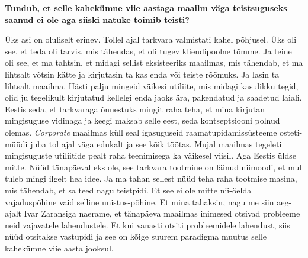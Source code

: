 \textbf{Tundub, et selle kahekümne viie aastaga maailm väga teistsuguseks 
saanud ei ole aga siiski natuke toimib teisti?}

Üks asi on oluliselt erinev. Tollel ajal tarkvara valmistati kahel põhjusel. 
Üks oli see, et teda oli tarvis, mis tähendas, et  oli tugev kliendipoolne 
tõmme. Ja teine oli see, et ma tahtsin, et midagi sellist eksisteeriks 
maailmas, mis tähendab, et ma lihtsalt võtsin kätte ja kirjutasin ta kas enda 
või teiste rõõmuks. Ja lasin ta lihtsalt maailma. Hästi palju mingeid väikesi 
utiliite, mis midagi kasulikku tegid, olid ju tegelikult kirjutatud kellelgi 
enda jaoks ära, pakendatud ja saadetud laiali. Eestis seda, et tarkvaraga 
õnnestuks mingit raha teha, et mina kirjutan mingisuguse vidinaga ja keegi 
maksab selle eest, seda kontseptsiooni polnud olemas. \emph{Corporate} maailmas 
küll seal igasuguseid  raamatupidamissüsteeme osteti-müüdi juba tol ajal väga 
edukalt ja see kõik töötas. Mujal maailmas tegeleti mingisuguste utiliitide 
pealt raha teenimisega ka väikesel viisil. Aga Eestis üldse mitte. Nüüd 
tänapäeval eks ole, see tarkvara tootmine on läinud niimoodi, et mul tuleb mingi 
ilgelt hea idee. Ja ma tahan sellest nüüd teha raha tootmise masina, mis 
tähendab, et sa teed nagu teistpidi. Et see ei ole mitte nii-öelda 
vajaduspõhine vaid selline unistus-põhine. Et mina tahaksin, nagu me siin 
aeg-ajalt  Ivar Zaransiga naerame, et tänapäeva 
maailmas  inimesed  otsivad probleeme neid vajavatele lahendustele. Et kui 
vanasti otsiti probleemidele lahendust, siis nüüd otsitakse vastupidi ja see on 
 kõige suurem paradigma muutus selle kahekümne viie aasta jooksul.
